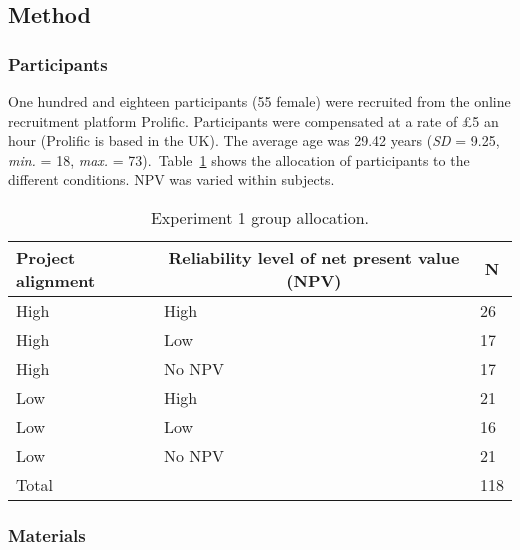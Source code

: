 \documentclass[a4paper, nobind]{templates/ociamthesis}
\theoremstyle{definition}
\theoremstyle{definition}
\theoremstyle{definition}
\theoremstyle{definition}
\theoremstyle{remark}
\begin{document}
\subsection{Method}

\subsubsection{Participants}

One hundred and eighteen participants (55 female) were recruited from the online recruitment platform Prolific. Participants were compensated at a rate of \pounds 5 an hour (Prolific is based in the UK). The average age was 29.42 years (\emph{SD} = 9.25, \emph{min.} = 18, \emph{max.} = 73).~Table~\ref{tab:condition-allocation-alignment-2}
shows the allocation of participants to the different conditions. NPV was varied
within subjects.

\begin{table}[tbp]

\begin{center}
\begin{threeparttable}

\caption{\label{tab:condition-allocation-alignment-2}Experiment 1 group allocation.}

\begin{tabular}{lll}
\toprule
Project alignment & \multicolumn{1}{c}{Reliability level of net present value (NPV)} & \multicolumn{1}{c}{N}\\
\midrule
High & High & 26\\
High & Low & 17\\
High & No NPV & 17\\
Low & High & 21\\
Low & Low & 16\\
Low & No NPV & 21\\
Total &  & 118\\
\bottomrule
\end{tabular}

\end{threeparttable}
\end{center}

\end{table}

\hypertarget{materials-alignment-2}{%
\subsubsection{Materials}\label{materials-alignment-2}}
\end{document}
